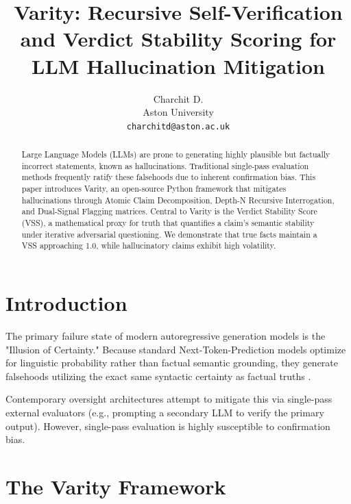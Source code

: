 \documentclass[10pt,twocolumn,letterpaper]{article}
\begin{document}
\title{Varity: Recursive Self-Verification and Verdict Stability Scoring for LLM Hallucination Mitigation}

\author{Charchit D.\\
Aston University\\
{\tt\small charchitd@aston.ac.uk}
}

\maketitle

\begin{abstract}
Large Language Models (LLMs) are prone to generating highly plausible but factually incorrect statements, known as hallucinations. Traditional single-pass evaluation methods frequently ratify these falsehoods due to inherent confirmation bias. This paper introduces Varity, an open-source Python framework that mitigates hallucinations through Atomic Claim Decomposition, Depth-N Recursive Interrogation, and Dual-Signal Flagging matrices. Central to Varity is the Verdict Stability Score (VSS), a mathematical proxy for truth that quantifies a claim's semantic stability under iterative adversarial questioning. We demonstrate that true facts maintain a VSS approaching 1.0, while hallucinatory claims exhibit high volatility.
\end{abstract}

\section{Introduction}

The primary failure state of modern autoregressive generation models is the "Illusion of Certainty." Because standard Next-Token-Prediction models optimize for linguistic probability rather than factual semantic grounding, they generate falsehoods utilizing the exact same syntactic certainty as factual truths \cite{ji2023survey}. 

Contemporary oversight architectures attempt to mitigate this via single-pass external evaluators (e.g., prompting a secondary LLM to verify the primary output). However, single-pass evaluation is highly susceptible to confirmation bias. 

\section{The Varity Framework}
\end{document}
